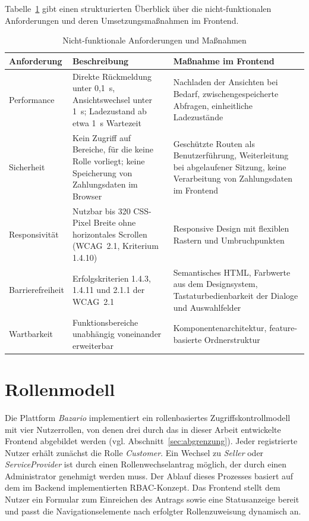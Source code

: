 Tabelle~\ref{tab:nichtfunktionale-anforderungen} gibt
einen strukturierten Überblick über die nicht-funktionalen
Anforderungen und deren Umsetzungsmaßnahmen im Frontend.

\begin{table}[htbp]
\centering
\caption{Nicht-funktionale Anforderungen und Maßnahmen}
\label{tab:nichtfunktionale-anforderungen}
\begin{tabular}{|p{3cm}|p{5.3cm}|p{5cm}|}
\hline
\textbf{Anforderung} & \textbf{Beschreibung} &
\textbf{Maßnahme im Frontend} \\
\hline
Performance & Direkte Rückmeldung unter 0,1~s, Ansichtswechsel
unter 1~s; Ladezustand ab etwa 1~s Wartezeit &
Nachladen der Ansichten bei Bedarf, zwischengespeicherte
Abfragen, einheitliche Ladezustände \\
\hline
Sicherheit & Kein Zugriff auf Bereiche, für die keine Rolle vorliegt; keine
Speicherung von Zahlungsdaten im Browser &
Geschützte Routen als Benutzerführung, Weiterleitung bei
abgelaufener Sitzung, keine Verarbeitung von Zahlungsdaten im
Frontend \\
\hline
Responsivität & Nutzbar bis 320 \acs{CSS}-Pixel Breite ohne
horizontales Scrollen (\acs{WCAG}~2.1, Kriterium 1.4.10) &
Responsive Design mit flexiblen Rastern und Umbruchpunkten \\
\hline
Barrierefreiheit & Erfolgskriterien 1.4.3, 1.4.11 und 2.1.1 der
\acs{WCAG}~2.1 &
Semantisches \acs{HTML}, Farbwerte aus dem Designsystem,
Tastaturbedienbarkeit der Dialoge und Auswahlfelder \\
\hline
Wartbarkeit & Funktionsbereiche unabhängig voneinander
erweiterbar &
Komponentenarchitektur, feature-basierte Ordnerstruktur \\
\hline
\end{tabular}
\end{table}


\section{Rollenmodell}
\label{sec:rollenmodell}

Die Plattform \textit{Bazario} implementiert ein rollenbasiertes
Zugriffskontrollmodell mit vier Nutzerrollen, von denen drei durch das
in dieser Arbeit entwickelte Frontend abgebildet werden (vgl.
Abschnitt~\ref{sec:abgrenzung}). Jeder registrierte Nutzer erhält zunächst
die Rolle \textit{Customer}. Ein Wechsel zu \textit{Seller} oder
\textit{ServiceProvider} ist durch einen Rollenwechselantrag
möglich, der durch einen Administrator genehmigt werden
muss. Der Ablauf dieses Prozesses basiert auf dem im Backend
implementierten \acs{RBAC}-Konzept. Das Frontend stellt dem
Nutzer ein Formular zum Einreichen des Antrags sowie
eine Statusanzeige bereit und passt die
Navigationselemente nach erfolgter Rollenzuweisung
dynamisch an.

